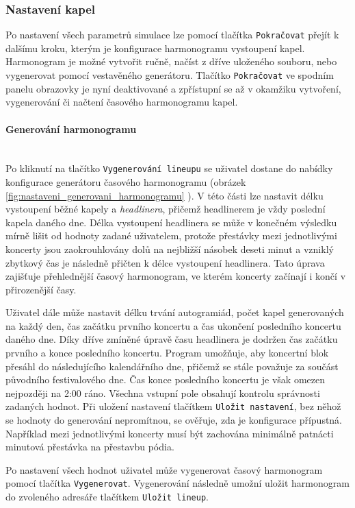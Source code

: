 \documentclass[
  program=itp,
  biblatex,
  figures=false,
  glossaries,
  index
]{kidiplom}
\begin{document}
\subsubsection{Nastavení kapel}
Po nastavení všech parametrů simulace lze pomocí tlačítka \texttt{Pokračovat} přejít k dalšímu kroku, kterým je konfigurace harmonogramu vystoupení kapel. Harmonogram je možné vytvořit ručně, načíst z dříve uloženého souboru, nebo vygenerovat pomocí vestavěného generátoru. Tlačítko \texttt{Pokračovat} ve spodním panelu obrazovky je nyní deaktivované a zpřístupní se až v okamžiku vytvoření, vygenerování či načtení časového harmonogramu kapel.

\paragraph{Generování harmonogramu}\hfill\\
Po kliknutí na tlačítko \texttt{Vygenerování lineupu} se uživatel dostane do nabídky konfigurace generátoru časového harmonogramu (obrázek \ref{fig:nastaveni_generovani_harmonogramu} ). V této části lze nastavit délku vystoupení běžné kapely a \emph{headlinera}, přičemž headlinerem je vždy poslední kapela daného dne. Délka vystoupení headlinera se může v konečném výsledku mírně lišit od hodnoty zadané uživatelem, protože přestávky mezi jednotlivými koncerty jsou zaokrouhlovány dolů na nejbližší násobek deseti minut a vzniklý zbytkový čas je následně přičten k délce vystoupení headlinera. Tato úprava zajišťuje přehlednější časový harmonogram, ve kterém koncerty začínají i končí v přirozenější časy.

Uživatel dále může nastavit délku trvání autogramiád, počet kapel generovaných na každý den, čas začátku prvního koncertu a čas ukončení posledního koncertu daného dne.  Díky dříve zmíněné úpravě času headlinera je dodržen čas začátku prvního a konce posledního koncertu. Program umožňuje, aby koncertní blok přesáhl do následujícího kalendářního dne, přičemž se stále považuje za součást původního festivalového dne. Čas konce posledního koncertu je však omezen nejpozději na 2:00 ráno. Všechna vstupní pole obsahují kontrolu správnosti zadaných hodnot. Při uložení nastavení tlačítkem \texttt{Uložit nastavení}, bez něhož se hodnoty do generování nepromítnou, se ověřuje, zda je konfigurace přípustná. Například mezi jednotlivými koncerty musí být zachována minimálně patnácti minutová přestávka na přestavbu pódia. 

Po nastavení všech hodnot uživatel může vygenerovat časový harmonogram pomocí tlačítka \texttt{Vygenerovat}. Vygenerování následně umožní uložit harmonogram do zvoleného adresáře tlačítkem \texttt{Uložit lineup}.
\end{document}
